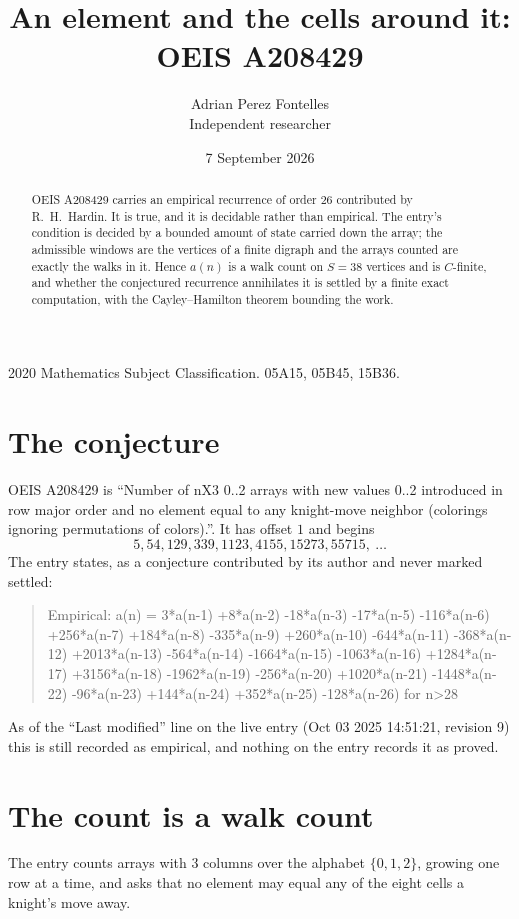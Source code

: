 \documentclass[11pt,a4paper]{article}
\title{An element and the cells around it: OEIS A208429}
\author{Adrian Perez Fontelles\\ \small Independent researcher}
\date{7 September 2026}
\theoremstyle{plain}
\theoremstyle{definition}
\begin{document}
\maketitle

\begin{abstract}
OEIS A208429 carries an empirical recurrence of order $26$ contributed by R.~H.~Hardin. It is
true, and it is decidable rather than empirical. The entry's condition is decided by a bounded amount of state carried down the array; the
admissible windows are the vertices of a finite digraph and the arrays counted are exactly the
walks in it. Hence $a(n)$ is a walk count on $S=38$ vertices and is $C$-finite, and whether the
conjectured recurrence annihilates it is settled by a finite exact computation, with the
Cayley--Hamilton theorem bounding the work.
\end{abstract}

\noindent\small 2020 Mathematics Subject Classification. 05A15, 05B45, 15B36.\normalsize

\section{The conjecture}

OEIS A208429 is ``Number of nX3 0..2 arrays with new values 0..2 introduced in row major order and no element equal to any knight-move neighbor (colorings ignoring permutations of colors).''. It has offset $1$ and begins
\[
5, 54, 129, 339, 1123, 4155, 15273, 55715,\ \dots
\]
The entry states, as a conjecture contributed by its author and never marked settled:
\begin{quote}
Empirical: a(n) = 3*a(n-1) +8*a(n-2) -18*a(n-3) -17*a(n-5) -116*a(n-6) +256*a(n-7) +184*a(n-8) -335*a(n-9) +260*a(n-10) -644*a(n-11) -368*a(n-12) +2013*a(n-13) -564*a(n-14) -1664*a(n-15) -1063*a(n-16) +1284*a(n-17) +3156*a(n-18) -1962*a(n-19) -256*a(n-20) +1020*a(n-21) -1448*a(n-22) -96*a(n-23) +144*a(n-24) +352*a(n-25) -128*a(n-26) for n>28
\end{quote}
As of the ``Last modified'' line on the live entry (Oct 03 2025 14:51:21, revision 9) this is still
recorded as empirical, and nothing on the entry records it as proved.

\section{The count is a walk count}

The entry counts arrays with $3$ columns over the alphabet $\{0,1,2\}$, growing one row at a time, and asks that no element may equal any of the eight cells a knight's move away.
\end{document}
